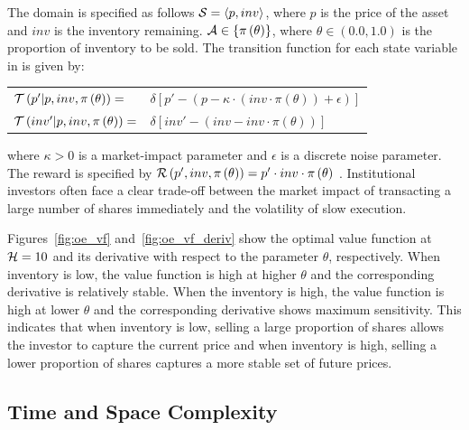 The domain is specified as follows {\footnotesize $ \mathcal{S} = \left\langle p, inv \right\rangle$}, where $ p $ is the price of the asset and $ inv $ is the inventory remaining. {\footnotesize $ \mathcal{A} \in \left\lbrace \pi\left( \theta \right) \right\rbrace$}, where {\footnotesize $ \theta \in \left( 0.0, 1.0\right)$} is the proportion of inventory to be sold. The transition function {\footnotesize \Transition} for each state variable in {\footnotesize \State} is given by:
{\footnotesize 
    \abovedisplayskip=5pt
    \belowdisplayskip=0pt
    \renewcommand{\arraystretch}{1.5}
    \begin{tabular}{ll}
        $\mathcal{T}\left( p' | p, inv, \pi\left( \theta \right) \right) =$ & $ \delta \left[ p' - (p - \kappa \cdot (inv \cdot \pi\left( \theta \right)) + \epsilon) \right] $ \\
        $\mathcal{T}\left( inv' | p, inv, \pi\left( \theta \right) \right) =$ & $\delta \left[ inv' - (inv - inv \cdot \pi\left( \theta \right)) \right] $ \\
    \end{tabular}
}%
where {\footnotesize $ \kappa > 0$} is a market-impact parameter and {\footnotesize $ \epsilon $} is a discrete noise parameter. The reward is specified by {\footnotesize $ \mathcal{R}\left(p', inv, \pi\left( \theta \right) \right) = p' \cdot inv \cdot \pi\left( \theta \right)$ }. Institutional investors often face a clear trade-off between the market impact of transacting a large number of shares immediately and the volatility of slow execution. 

Figures~\ref{fig:oe_vf} and~\ref{fig:oe_vf_deriv} show the optimal value function at {\footnotesize $ \mathcal{H} = 10 $} and its derivative with respect to the parameter {\footnotesize $ \theta$}, respectively. When inventory is low, the value function is high at higher {\footnotesize $ \theta$} and the corresponding derivative is relatively stable. When the inventory is high, the value function is high at lower {\footnotesize $ \theta$} and the corresponding derivative shows maximum sensitivity. This indicates that when inventory is low, selling a large proportion of shares allows the investor to capture the current price and when inventory is high, selling a lower proportion of shares captures a more stable set of future prices. 

\subsection{Time and Space Complexity}

